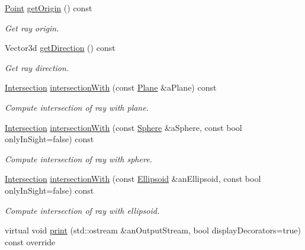 \begin{DoxyCompactItemize}
\hyperlink{classlibrary_1_1math_1_1geom_1_1d3_1_1objects_1_1_point}{Point} \hyperlink{classlibrary_1_1math_1_1geom_1_1d3_1_1objects_1_1_ray_abaac9b7fcc10e2076ada11f2798386bd}{get\+Origin} () const
\begin{DoxyCompactList}\small\item\em Get ray origin. \end{DoxyCompactList}\item 
Vector3d \hyperlink{classlibrary_1_1math_1_1geom_1_1d3_1_1objects_1_1_ray_ab2e0a6cfd7c2c288ec615a479024fb7d}{get\+Direction} () const
\begin{DoxyCompactList}\small\item\em Get ray direction. \end{DoxyCompactList}\item 
\hyperlink{classlibrary_1_1math_1_1geom_1_1d3_1_1_intersection}{Intersection} \hyperlink{classlibrary_1_1math_1_1geom_1_1d3_1_1objects_1_1_ray_a50ede8e46490ec58931cb82754de873f}{intersection\+With} (const \hyperlink{classlibrary_1_1math_1_1geom_1_1d3_1_1objects_1_1_plane}{Plane} \&a\+Plane) const
\begin{DoxyCompactList}\small\item\em Compute intersection of ray with plane. \end{DoxyCompactList}\item 
\hyperlink{classlibrary_1_1math_1_1geom_1_1d3_1_1_intersection}{Intersection} \hyperlink{classlibrary_1_1math_1_1geom_1_1d3_1_1objects_1_1_ray_a54e7c2fa56bd086efbf85aa18674b403}{intersection\+With} (const \hyperlink{classlibrary_1_1math_1_1geom_1_1d3_1_1objects_1_1_sphere}{Sphere} \&a\+Sphere, const bool only\+In\+Sight=false) const
\begin{DoxyCompactList}\small\item\em Compute intersection of ray with sphere. \end{DoxyCompactList}\item 
\hyperlink{classlibrary_1_1math_1_1geom_1_1d3_1_1_intersection}{Intersection} \hyperlink{classlibrary_1_1math_1_1geom_1_1d3_1_1objects_1_1_ray_aea1460113fed4868d652c5f3bd7a9422}{intersection\+With} (const \hyperlink{classlibrary_1_1math_1_1geom_1_1d3_1_1objects_1_1_ellipsoid}{Ellipsoid} \&an\+Ellipsoid, const bool only\+In\+Sight=false) const
\begin{DoxyCompactList}\small\item\em Compute intersection of ray with ellipsoid. \end{DoxyCompactList}\item 
virtual void \hyperlink{classlibrary_1_1math_1_1geom_1_1d3_1_1objects_1_1_ray_a2140183dca4c36f5c51ed9e8f2cd220d}{print} (std\+::ostream \&an\+Output\+Stream, bool display\+Decorators=true) const override

\end{DoxyCompactItemize}
